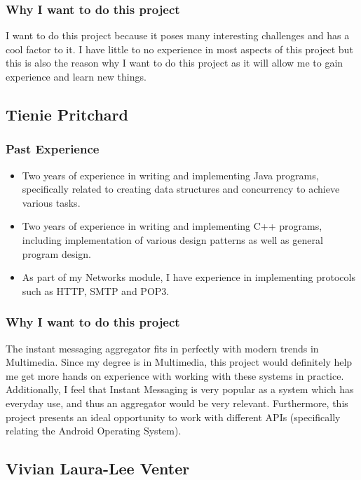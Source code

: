 \subsubsection{Why I want to do this project} 
I want to do this project because it poses many interesting challenges and has a cool factor to it. I have little to no experience in most aspects of this project but this is also the reason why I want to do this project as it will allow me to gain experience and learn new things. 

\pagebreak
\subsection{Tienie Pritchard}

\subsubsection{Past Experience} 
\begin{itemize}
	\item{Two years of experience in writing and implementing Java programs, specifically related to creating data structures and concurrency to achieve various tasks}.
	\item{Two years of experience in writing and implementing C++ programs, including implementation of various design patterns as well as general program design}.
	\item{As part of my Networks module, I have experience in implementing protocols such as HTTP, SMTP and POP3}.
\end{itemize}
\subsubsection{Why I want to do this project}
The instant messaging aggregator fits in perfectly with modern trends in Multimedia. Since my degree is in Multimedia, this project would definitely help me get more hands on experience with working with these systems in practice. Additionally, I feel that Instant Messaging is very popular as a system which has everyday use, and thus an aggregator would be very relevant. Furthermore, this project presents an ideal opportunity to work with different APIs (specifically relating the Android Operating System).



\pagebreak
\subsection{Vivian Laura-Lee Venter}

